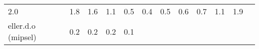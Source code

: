 \documentclass[parskip=half]{scrartcl}
\begin{document}
\begin{table}[h]
\begin{tabular}{@{}llllllllllll@{}}
\begin{minipage}[t]{0.05\columnwidth}
2.0\strut
\end{minipage} & \begin{minipage}[t]{0.05\columnwidth}\raggedright\strut
1.8\strut
\end{minipage} & \begin{minipage}[t]{0.05\columnwidth}\raggedright\strut
1.6\strut
\end{minipage} & \begin{minipage}[t]{0.05\columnwidth}\raggedright\strut
1.1\strut
\end{minipage} & \begin{minipage}[t]{0.05\columnwidth}\raggedright\strut
0.5\strut
\end{minipage} & \begin{minipage}[t]{0.05\columnwidth}\raggedright\strut
0.4\strut
\end{minipage} & \begin{minipage}[t]{0.05\columnwidth}\raggedright\strut
0.5\strut
\end{minipage} & \begin{minipage}[t]{0.05\columnwidth}\raggedright\strut
0.6\strut
\end{minipage} & \begin{minipage}[t]{0.05\columnwidth}\raggedright\strut
0.7\strut
\end{minipage} & \begin{minipage}[t]{0.05\columnwidth}\raggedright\strut
1.1\strut
\end{minipage} & \begin{minipage}[t]{0.05\columnwidth}\raggedright\strut
1.9\strut
\end{minipage}\tabularnewline
\begin{minipage}[t]{0.12\columnwidth}\raggedright\strut
eller.d.o (mipsel)\strut
\end{minipage} & \begin{minipage}[t]{0.05\columnwidth}\raggedright\strut
0.2\strut
\end{minipage} & \begin{minipage}[t]{0.05\columnwidth}\raggedright\strut
0.2\strut
\end{minipage} & \begin{minipage}[t]{0.05\columnwidth}\raggedright\strut
0.2\strut
\end{minipage} & \begin{minipage}[t]{0.05\columnwidth}\raggedright\strut
0.1\strut
\end{minipage} & \begin{minipage}[t]{0.05\columnwidth}\raggedright\strut

\end{minipage}
\end{tabular}
\end{table}
\end{document}
